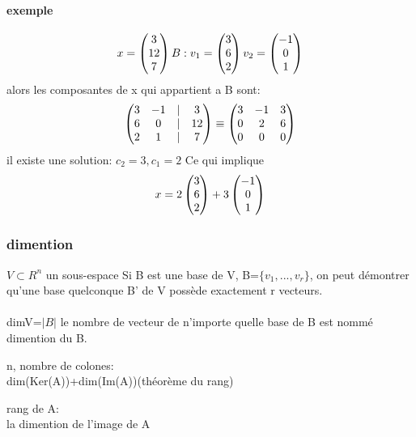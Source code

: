 \documentclass[a4paper,10pt]{article}
\begin{document}
\paragraph{exemple}
\[x=
\begin{pmatrix}
3\cr
12\cr
7\cr
\end{pmatrix}
B:v_1=
\begin{pmatrix}
3\cr
6\cr
2\cr
\end{pmatrix}
v_2=
\begin{pmatrix}
-1\cr
0\cr
1\cr
\end{pmatrix}
\]
\newline
alors les composantes de x qui appartient a B sont:
\[
\begin{pmatrix}
3&-1&|&3\cr
6&0&|&12\cr
2&1&|&7\cr
\end{pmatrix}
\equiv
\begin{pmatrix}
3&-1&3\cr
0&2&6\cr
0&0&0\cr
\end{pmatrix}
\]
\newline
il existe une solution: $c_2=3,c_1=2$
\newline
Ce qui implique
\newline
\[
x=2
\begin{pmatrix}
3\cr
6\cr
2\cr
\end{pmatrix}
+3
\begin{pmatrix}
-1\cr
0\cr
1\cr
\end{pmatrix}
\]
\subsubsection{dimention}
$V\subset R^n$ un sous-espace 
\newline
Si B est une base de V, B=$\{v_1,...,v_r\}$, on peut démontrer qu'une base quelconque B' de V possède exactement r vecteurs.
\paragraph{}
dimV=$|B|$
\newline
le nombre de vecteur de n'importe quelle base de B est nommé dimention du B.
\begin{description}
 \item n, nombre de colones:\\{ dim(Ker(A))+dim(Im(A))(théorème du rang)}
 \item rang de A:\\{la dimention de l'image de A}
\end{description}
\end{document}
